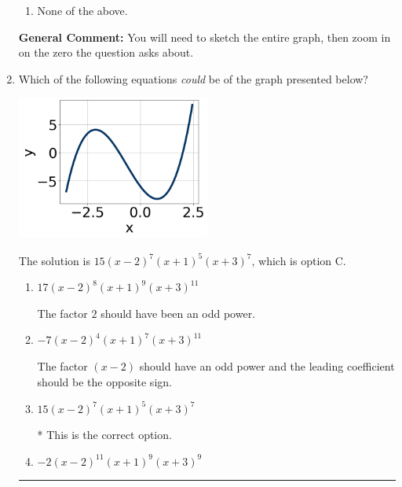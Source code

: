 \documentclass{extbook}[14pt]
\newcommand{\litem}[1]{\item #1

\rule{\textwidth}{0.4pt}}
\begin{document}
\begin{enumerate}
{\begin{enumerate}[label=\Alph*.]
\item None of the above.\end{enumerate}
\textbf{General Comment:} You will need to sketch the entire graph, then zoom in on the zero the question asks about.
}
\litem{
Which of the following equations \textit{could} be of the graph presented below?

\begin{center}
    \includegraphics[width=0.5\textwidth]{../Figures/polyGraphToFunctionCopyA.png}
\end{center}


The solution is \( 15(x - 2)^{7} (x + 1)^{5} (x + 3)^{7} \), which is option C.\begin{enumerate}[label=\Alph*.]
\item \( 17(x - 2)^{8} (x + 1)^{9} (x + 3)^{11} \)

The factor $2$ should have been an odd power.
\item \( -7(x - 2)^{4} (x + 1)^{7} (x + 3)^{11} \)

The factor $(x - 2)$ should have an odd power and the leading coefficient should be the opposite sign.
\item \( 15(x - 2)^{7} (x + 1)^{5} (x + 3)^{7} \)

* This is the correct option.
\item \( -2(x - 2)^{11} (x + 1)^{9} (x + 3)^{9} \)


\end{enumerate}}
\end{enumerate}
\end{document}
